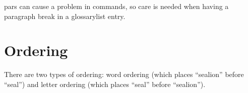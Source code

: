 \documentclass[a4paper]{report}
\begin{document}
\Glspl{par} can cause a problem in commands, so care is needed
when having a paragraph break in a \gls{glossarylist} entry.

\chapter{Ordering}

There are two types of ordering: word ordering (which places
``\gls{sealion}'' before ``\gls{seal}'') and letter ordering
(which places ``\gls{seal}'' before ``\gls{sealion}'').

\printglossaries
\end{document}

